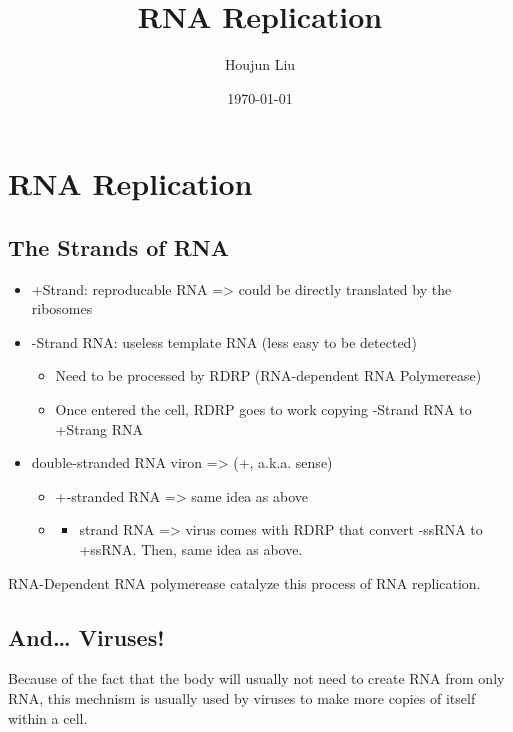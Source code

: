 \documentclass[letterpaper]{article}
\author{Houjun Liu}
\date{\today}
\title{RNA Replication}
\renewcommand\maketitle{}
\begin{document}
\maketitle


\section{RNA Replication}
\label{sec:orgf7aab89}
\subsection{The Strands of RNA}
\label{sec:org32f08f5}
\begin{itemize}
\item +Strand: reproducable RNA => could be directly translated by the
ribosomes
\item -Strand RNA: useless template RNA (less easy to be detected)

\begin{itemize}
\item Need to be processed by RDRP (RNA-dependent RNA Polymerease)
\item Once entered the cell, RDRP goes to work copying -Strand RNA to
+Strang RNA
\end{itemize}

\item double-stranded RNA viron => (+, a.k.a. sense)

\begin{itemize}
\item +-stranded RNA => same idea as above

\item \begin{itemize}
\item strand RNA => virus comes with RDRP that convert -ssRNA to +ssRNA.
Then, same idea as above.
\end{itemize}
\end{itemize}
\end{itemize}

RNA-Dependent RNA polymerease catalyze this process of RNA replication.

\subsection{And\ldots{} Viruses!}
\label{sec:orgc103261}
Because of the fact that the body will usually not need to create RNA
from only RNA, this mechnism is usually used by viruses to make more
copies of itself within a cell.
\end{document}
